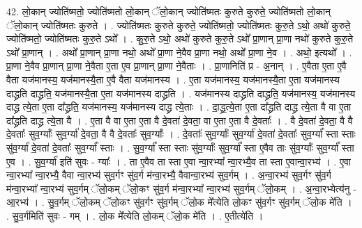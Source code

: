 \documentclass[17pt]{extarticle}
\begin{document}
42. लो॒कान् ज्योति॑ष्मतो॒ ज्योति॑ष्मतो लो॒कान् ॅलो॒कान् ज्योति॑ष्मतः कुरुते कुरुते॒ ज्योति॑ष्मतो लो॒कान् ॅलो॒कान् ज्योति॑ष्मतः कुरुते । . ज्योति॑ष्मतः कुरुते कुरुते॒ ज्योति॑ष्मतो॒ ज्योति॑ष्मतः कुरु॒ते ऽथो॒ अथो॑ कुरुते॒ ज्योति॑ष्मतो॒ ज्योति॑ष्मतः कुरु॒ते ऽथो᳚ । . कु॒रु॒ते ऽथो॒ अथो॑ कुरुते कुरु॒ते ऽथो᳚ प्रा॒णान् प्रा॒णा नथो॑ कुरुते कुरु॒ते ऽथो᳚ प्रा॒णान् । . अथो᳚ प्रा॒णान् प्रा॒णा नथो॒ अथो᳚ प्रा॒णा ने॒वैव प्रा॒णा नथो॒ अथो᳚ प्रा॒णा ने॒व । . अथो॒ इत्यथो᳚ । . प्रा॒णा ने॒वैव प्रा॒णान् प्रा॒णा ने॒वैता ए॒ता ए॒व प्रा॒णान् प्रा॒णा ने॒वैताः । . प्रा॒णानिति॑ प्र - अ॒नान् । . ए॒वैता ए॒ता ए॒वै वैता यज॑मानस्य॒ यज॑मानस्यै॒ता ए॒वै वैता यज॑मानस्य । . ए॒ता यज॑मानस्य॒ यज॑मानस्यै॒ता ए॒ता यज॑मानस्य दाद्ध्रति दाद्ध्रति॒ यज॑मानस्यै॒ता ए॒ता यज॑मानस्य दाद्ध्रति । . यज॑मानस्य दाद्ध्रति दाद्ध्रति॒ यज॑मानस्य॒ यज॑मानस्य दाद्ध्र त्ये॒ता ए॒ता दा᳚द्ध्रति॒ यज॑मानस्य॒ यज॑मानस्य दाद्ध्र त्ये॒ताः । . दा॒द्ध्र॒त्ये॒ता ए॒ता दा᳚द्ध्रति दाद्ध्र त्ये॒ता वै वा ए॒ता दा᳚द्ध्रति दाद्ध्र त्ये॒ता वै । . ए॒ता वै वा ए॒ता ए॒ता वै दे॒वता॑ दे॒वता॒ वा ए॒ता ए॒ता वै दे॒वताः᳚ । . वै दे॒वता॑ दे॒वता॒ वै वै दे॒वताः᳚ सुव॒र्ग्याः᳚ सुव॒र्ग्या॑ दे॒वता॒ वै वै दे॒वताः᳚ सुव॒र्ग्याः᳚ । . दे॒वताः᳚ सुव॒र्ग्याः᳚ सुव॒र्ग्या॑ दे॒वता॑ दे॒वताः᳚ सुव॒र्ग्या᳚ स्ता स्ताः सु॑व॒र्ग्या॑ दे॒वता॑ दे॒वताः᳚ सुव॒र्ग्या᳚ स्ताः । . सु॒व॒र्ग्या᳚ स्ता स्ताः सु॑व॒र्ग्याः᳚ सुव॒र्ग्या᳚ स्ता ए॒वैव ताः सु॑व॒र्ग्याः᳚ सुव॒र्ग्या᳚ स्ता ए॒व । . सु॒व॒र्ग्या॑ इति॑ सुवः - ग्याः᳚ । . ता ए॒वैव ता स्ता ए॒वा न्वा॒रभ्या᳚ न्वा॒रभ्यै॒व ता स्ता ए॒वान्वा॒रभ्य॑ । . ए॒वा न्वा॒रभ्या᳚ न्वा॒रभ्यै॒ वैवा न्वा॒रभ्य॑ सुव॒र्गꣳ सु॑व॒र्ग म॑न्वा॒रभ्यै॒ वैवान्वा॒रभ्य॑ सुव॒र्गम् । . अ॒न्वा॒रभ्य॑ सुव॒र्गꣳ सु॑व॒र्ग म॑न्वा॒रभ्या᳚ न्वा॒रभ्य॑ सुव॒र्गम् ॅलो॒कम् ॅलो॒कꣳ सु॑व॒र्ग म॑न्वा॒रभ्या᳚ न्वा॒रभ्य॑ सुव॒र्गम् ॅलो॒कम् । . अ॒न्वा॒रभ्येत्य॑नु - आ॒रभ्य॑ । . सु॒व॒र्गम् ॅलो॒कम् ॅलो॒कꣳ सु॑व॒र्गꣳ सु॑व॒र्गम् ॅलो॒क मे᳚त्येति लो॒कꣳ सु॑व॒र्गꣳ सु॑व॒र्गम् ॅलो॒क मे॑ति । . सु॒व॒र्गमिति॑ सुवः - गम् । . लो॒क मे᳚त्येति लो॒कम् ॅलो॒क मे॑ति । . ए॒तीत्ये॑ति । \newline
\pagebreak
{}
\end{document}
